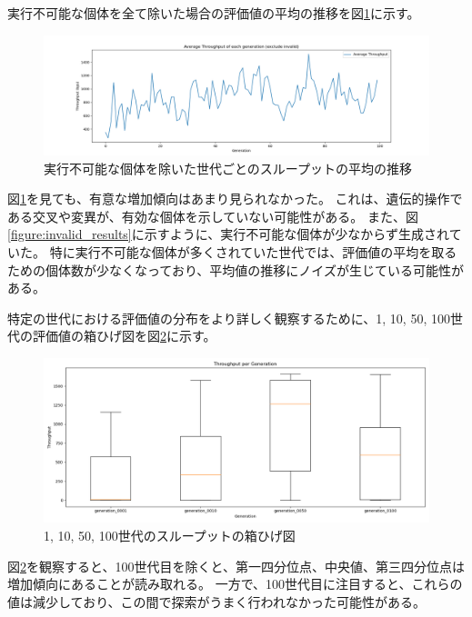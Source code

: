 \documentclass[a4paper,11pt]{jreport}
\newcommand{\figref}[1]{図\ref{#1}}
\begin{document}
実行不可能な個体を全て除いた場合の評価値の平均の推移を\figref{figure:generation_result_exclude_zero}に示す。
\begin{figure}[thbp]
  \setlength\fboxsep{0pt}
  \centering
  \includegraphics[width=0.9\linewidth]{fig/chap05/generation_throughput_exclude_zero.png}
  \caption{実行不可能な個体を除いた世代ごとのスループットの平均の推移}
  \label{figure:generation_result_exclude_zero}
\end{figure}
\figref{figure:generation_result_exclude_zero}を見ても、有意な増加傾向はあまり見られなかった。
これは、遺伝的操作である交叉や変異が、有効な個体を示していない可能性がある。
また、\figref{figure:invalid_results}に示すように、実行不可能な個体が少なからず生成されていた。
特に実行不可能な個体が多くされていた世代では、評価値の平均を取るための個体数が少なくなっており、平均値の推移にノイズが生じている可能性がある。

特定の世代における評価値の分布をより詳しく観察するために、1, 10, 50, 100世代の評価値の箱ひげ図を\figref{figure:boxplot_throughput}に示す。
\begin{figure}[thbp]
  \setlength\fboxsep{0pt}
  \centering
  \includegraphics[width=0.9\linewidth]{fig/chap05/boxplot_throughput.png}
  \caption{1, 10, 50, 100世代のスループットの箱ひげ図}
  \label{figure:boxplot_throughput}
\end{figure}
\figref{figure:boxplot_throughput}を観察すると、100世代目を除くと、第一四分位点、中央値、第三四分位点は増加傾向にあることが読み取れる。
一方で、100世代目に注目すると、これらの値は減少しており、この間で探索がうまく行われなかった可能性がある。
\end{document}
